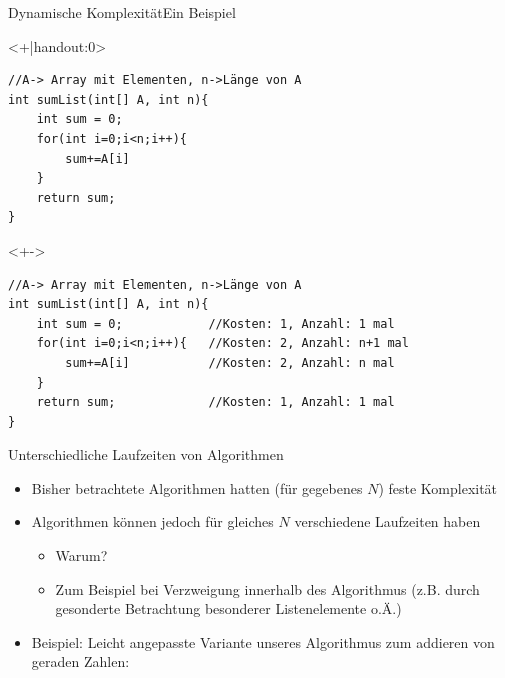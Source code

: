 \begin{frame}[fragile]{Dynamische Komplexität}{Ein Beispiel}
\lstset{style=java}
\begin{onlyenv}<+|handout:0>
\begin{lstlisting}
//A-> Array mit Elementen, n->Länge von A
int sumList(int[] A, int n){
    int sum = 0;
    for(int i=0;i<n;i++){
        sum+=A[i]
    }
    return sum;
}
\end{lstlisting}
\end{onlyenv}

\begin{onlyenv}<+->
\begin{lstlisting}
//A-> Array mit Elementen, n->Länge von A
int sumList(int[] A, int n){
    int sum = 0;            //Kosten: 1, Anzahl: 1 mal
    for(int i=0;i<n;i++){   //Kosten: 2, Anzahl: n+1 mal
        sum+=A[i]           //Kosten: 2, Anzahl: n mal
    }
    return sum;             //Kosten: 1, Anzahl: 1 mal
}
\end{lstlisting}
\end{onlyenv}





\end{frame}

\begin{frame}{Unterschiedliche Laufzeiten von Algorithmen}
    \begin{itemize}[<+->]
        \item Bisher betrachtete Algorithmen hatten (für gegebenes $N$) feste Komplexität
        \item Algorithmen können jedoch für gleiches $N$ verschiedene Laufzeiten haben
        \begin{itemize}
            \item Warum?
            \item Zum Beispiel bei Verzweigung innerhalb des Algorithmus (z.B. durch gesonderte Betrachtung besonderer Listenelemente o.Ä.)
        \end{itemize}
        \item Beispiel: Leicht angepasste Variante unseres Algorithmus zum addieren von geraden Zahlen:
    \end{itemize}
\end{frame}

